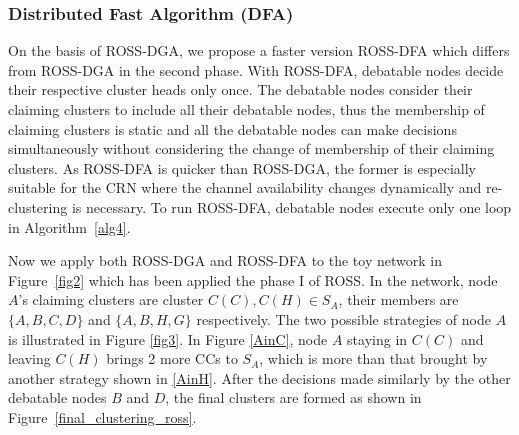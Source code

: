 \documentclass[10pt,journal,compsoc]{IEEEtran}
\theoremstyle{mytheoremstyle}
\theoremstyle{mytheoremstyle}
\theoremstyle{mytheoremstyle}
\begin{document}
\subsubsection{Distributed Fast Algorithm (DFA)}
On the basis of ROSS-DGA, we propose a faster version ROSS-DFA which differs from ROSS-DGA in the second phase.
With ROSS-DFA, debatable nodes decide their respective cluster heads only once.
The debatable nodes consider their claiming clusters to include all their debatable nodes, thus the membership of claiming clusters is static and all the debatable nodes can make decisions simultaneously without considering the change of membership of their claiming clusters.
As ROSS-DFA is quicker than ROSS-DGA, the former is especially suitable for the CRN where the channel availability changes dynamically and re-clustering is necessary.
To run ROSS-DFA, debatable nodes execute only one loop in Algorithm~\ref{alg4}.

Now we apply both ROSS-DGA and ROSS-DFA to the toy network in Figure~\ref{fig2} which has been applied the phase I of ROSS.
In the network, node $A$'s claiming clusters are cluster $C(C), C(H)\in S_A$, their members are $\{A,B,C,D\}$ and $\{A,B,H,G\}$ respectively. 
The two possible strategies of node $A$ is illustrated in Figure \ref{fig3}.
In Figure \ref{AinC}, node $A$ staying in $C(C)$ and leaving $C(H)$ brings 2 more CCs to $S_A$, which is more than that brought by another strategy shown in \ref{AinH}.
After the decisions made similarly by the other debatable nodes $B$ and $D$, the final clusters are formed as shown in Figure~\ref{final_clustering_ross}.

\end{document}
